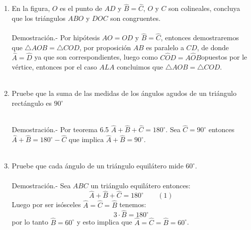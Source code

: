 \documentclass[10pt]{article}
\begin{document}
\begin{enumerate}
    
\item En la figura, $O$ es el punto de $AD$ y $\widehat{B}=\widehat{C}$, $O$ y $C$ son colineales, concluya que los triángulos $ABO$ y $DOC$ son congruentes.\\\\
    Demostración.-\; Por hipótesis $AO=OD$ y $\widehat{B}=\widehat{C}$, entonces demostraremos que $\triangle AOB = \triangle COD$, por proposición $AB$ es paralelo a $CD$, de donde $\widehat{A}=\widehat{D}$ ya que son correspondientes, luego como $C\widehat{O}D=A\widehat{O}B$opuestos por le vértice, entonces por el caso $ALA$ concluimos que $\triangle AOB=\triangle COD$.\\\\

\item Pruebe que la suma de las medidas de los ángulos agudos de un triángulo rectángulo es $90^{\circ}$\\\\
\begin{center}
\end{center}
    Demostración.-\; Por teorema 6.5 $\widehat{A} + \widehat{B} + \widehat{C} = 180^{\circ}.$ Sea $\widehat{C}=90^{\circ}$ entonces $\widehat{A}+\widehat{B}=180^{\circ} - \widehat{C}$ que implica $\widehat{A}+\widehat{B}=90^{\circ}$.\\\\

\item Pruebe que cada ángulo de un triángulo equilátero mide $60^{\circ}$.\\\\
    Demostración.-\; Sea $ABC$  un triángulo equilátero entonces: $$\widehat{A}+\widehat{B}+\widehat{C}=180^{\circ} \qquad (1)$$ Luego por ser isósceles $\widehat{A}=\widehat{C}=\widehat{B}$ tenemos: $$3\cdot \widehat{B}=180^{\circ}$$ por lo tanto $\widehat{B}=60^{\circ}$  y esto implica que $\widehat{A}=\widehat{C}=\widehat{B}=60^{\circ}$.\\\\


\end{enumerate}
\end{document}
